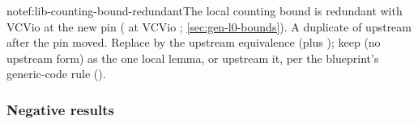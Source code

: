 \begin{finding}{note}{f:lib-counting-bound-redundant}{The local counting bound is redundant with VCVio at the new pin}
 \allowbreak{}\allowbreak{}\allowbreak{}
( at VCVio ; \cref{sec:gen-l0-bounds}).
 A duplicate of upstream after the pin moved.
 Replace \allowbreak{}\allowbreak{}\allowbreak{} by the upstream
equivalence (plus ); keep  (no upstream form) as the
one local lemma, or upstream it, per the blueprint's generic-code rule
().
\end{finding}

\subsubsection{Negative results}\label{sec:gen-lib-negative}

